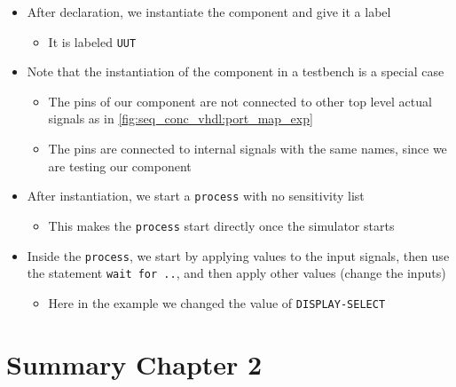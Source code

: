 \begin{enumerate}
\begin{itemize}
	\begin{itemize}
	\item That's why we have for example the 3 \verb|signal| lines after component declaration
	\end{itemize}

\item After declaration, we instantiate the component and give it a label

	\begin{itemize}
	\item It is labeled \verb|UUT|
	\end{itemize}

\item Note that the instantiation of the component in a testbench is a special case

	\begin{itemize}
	\item The pins of our component are not connected to other top level actual signals as in \autoref{fig:seq_conc_vhdl:port_map_exp}
	
	\item The pins are connected to internal signals with the same names, since we are testing our component	
	
	\end{itemize}

\item After instantiation, we start a \verb|process| with no sensitivity list

	\begin{itemize}
	\item This makes the \verb|process| start directly once the simulator starts
	\end{itemize}


\item Inside the \verb|process|, we start by applying values to the input signals, then use the statement \verb|wait for ..|, and then apply other values (change the inputs)

	\begin{itemize}
	\item Here in the example we changed the value of \verb|DISPLAY-SELECT|
	\end{itemize}


\end{itemize}


\end{enumerate}

\newpage
\section{Summary Chapter 2}

